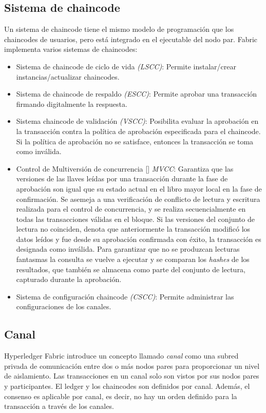 \subsection{Sistema de chaincode}
Un sistema de chaincode tiene el mismo modelo de programaci\'on que los chaincodes de usuarios, pero est\'a integrado en el ejecutable del nodo par. Fabric implementa varios sistemas de chaincodes:
\begin{itemize}
\item Sistema de chaincode de ciclo de vida \emph{(LSCC)}: Permite instalar/crear instancias/actualizar chaincodes.

\item Sistema de chaincode de respaldo \emph{(ESCC)}: Permite aprobar una transacci\'on firmando digitalmente la respuesta.

\item Sistema chaincode de validaci\'on \emph{(VSCC)}: Posibilita evaluar la aprobaci\'on en la transacci\'on contra la pol\'itica de aprobaci\'on especificada para el chaincode. Si la pol\'itica de aprobaci\'on no se satisface, entonces la transacci\'on se toma como inv\'alida.

\item Control de Multiversi\'on de concurrencia [\cite{papadimitriou1984concurrency}] \emph{MVCC}: Garantiza que las versiones de las llaves le\'idas por una transacci\'on durante la fase de aprobaci\'on son igual que su estado actual en el libro mayor local en la fase de confirmaci\'on. Se asemeja a una verificaci\'on de conflicto de lectura y escritura realizada para el control de concurrencia, y se realiza secuencialmente en todas las transacciones v\'alidas en el bloque. Si las versiones del conjunto de lectura no coinciden, denota que anteriormente la transacci\'on modific\'o los datos le\'idos y fue desde su aprobaci\'on confirmada con \'exito, la transacci\'on es designada como inv\'alida. Para garantizar que no se produzcan lecturas fantasmas la consulta se vuelve a ejecutar y se comparan los \emph{hashes} de los resultados, que tambi\'en se almacena como parte del conjunto de lectura, capturado durante la aprobaci\'on.

\item Sistema de configuraci\'on chaincode \emph{(CSCC)}: Permite administrar las configuraciones de los canales.
\end{itemize}


\subsection{Canal}
Hyperledger Fabric introduce un concepto llamado \emph{canal} como una subred privada de comunicaci\'on entre dos o m\'as nodos pares para proporcionar un nivel de aislamiento. Las transacciones en un canal solo son vistos por sus nodos pares y participantes. El ledger y los chaincodes son definidos por canal. Adem\'as, el consenso es aplicable por canal, es decir, no hay un orden definido para la transacci\'on a trav\'es de los canales.

